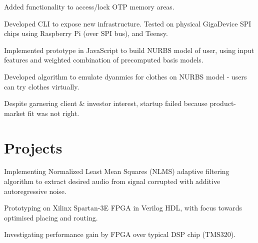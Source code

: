 \documentclass[]{deedy}
\begin{document}
\begin{minipage}[t]{0.69\textwidth}
\begin{flushleft}
\begin{tightemize}
\item Added functionality to access/lock OTP memory areas.
\item Developed CLI to expose new infrastructure. Tested on physical GigaDevice SPI chips using Raspberry Pi (over SPI bus), and Teensy.
\end{tightemize}
\sectionsep
%
\vspace{1.1pt}
\begin{tightemize}
\item Implemented prototype in JavaScript to build NURBS model of user, using input features and weighted combination of precomputed basis models.
\item Developed algorithm to emulate dyanmics for clothes on NURBS model - users can try clothes virtually.
\item Despite garnering client \& investor interest, startup failed because product-market fit was not right.
\end{tightemize}
\sectionsep
\section{Projects}
%
\vspace{1.1pt}
\begin{tightemize}
\item Implementing Normalized Least Mean Squares (NLMS) adaptive filtering algorithm to extract desired audio from signal corrupted with additive autoregressive noise.
\item Prototyping on Xilinx Spartan-3E FPGA in Verilog HDL, with focus towards optimised placing and routing.
\item Investigating performance gain by FPGA over typical DSP chip (TMS320).
\end{tightemize}
\sectionsep
%
\end{flushleft}
\end{minipage}
\end{document}

